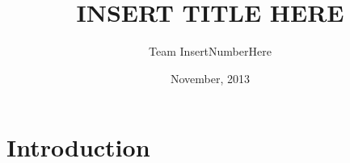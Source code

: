 \documentclass[12pt]{article}
\title{\textbf{INSERT TITLE HERE}}
\author{Team InsertNumberHere}
\date{November, 2013}
\begin{document}
\maketitle

\begin{abstract}
\end{abstract}

\section{Introduction}


\end{document}
